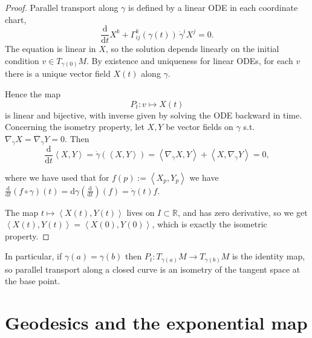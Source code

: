 \begin{proof}
Parallel transport along $\gamma$ is defined by a linear ODE in each coordinate chart,
\[
\frac{\mathrm{d}}{\mathrm{d}t} X^k + \Gamma_{ij}^k(\gamma(t))\, \dot{\gamma}^i X^j = 0.
\]
The equation is linear in $X$, so the solution depends linearly on the initial condition
$v \in T_{\gamma(0)}M$. By existence and uniqueness for linear ODEs, for each $v$ there is a unique
vector field $X(t)$ along $\gamma$.

Hence the map
\[
P_t : v \longmapsto X(t)
\]
is linear and bijective, with inverse given by solving the ODE backward in time.\\

Concerning the isometry property, let $X, Y$ be vector fields on $\gamma$ s.t. $\nabla_{\dot\gamma} X = \nabla_{\dot\gamma} Y = 0$. Then
$$\frac{\mathrm{d}}{\mathrm{d}t} \left \langle X,Y \right \rangle = \dot\gamma (\left \langle X,Y \right \rangle) = \left \langle \nabla_{\dot\gamma} X,Y \right \rangle + \left \langle X,\nabla_{\dot\gamma} Y \right \rangle = 0,$$

where we have used that for $f(p):=\left \langle X_p,Y_p \right \rangle$ we have $\frac{\mathrm{d}}{\mathrm{d}t}(f\circ \gamma)(t) = \mathrm{d}\gamma \left ( \frac{\mathrm{d}}{\mathrm{d}t} \right )(f)=\dot\gamma(t)f$. 

The map $t\mapsto \left \langle X(t),Y(t) \right \rangle$ lives on $I\subset \mathbb{R}$, and has zero derivative, so we get $\left \langle X(t),Y(t) \right \rangle = \left \langle X(0),Y(0) \right \rangle$, which is exactly the isometric property.
\end{proof}

In particular, if $\gamma(a)=\gamma(b)$ then $P_t:T_{\gamma(a)} M \to T_{\gamma(b)} M$ is the identity map, so parallel transport along a closed curve is an isometry of the tangent space at the base point.




















\newpage
\section{Geodesics and the exponential map}

